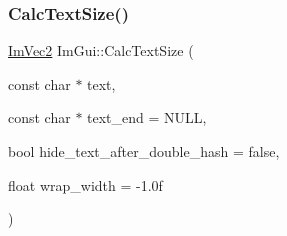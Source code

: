 \subsubsection{\texorpdfstring{Calc\+Text\+Size()}{CalcTextSize()}}
{\footnotesize\ttfamily \mbox{\hyperlink{struct_im_vec2}{Im\+Vec2}} Im\+Gui\+::\+Calc\+Text\+Size (\begin{DoxyParamCaption}\item[{const char $\ast$}]{text,  }\item[{const char $\ast$}]{text\+\_\+end = {\ttfamily NULL},  }\item[{bool}]{hide\+\_\+text\+\_\+after\+\_\+double\+\_\+hash = {\ttfamily false},  }\item[{float}]{wrap\+\_\+width = {\ttfamily -\/1.0f} }\end{DoxyParamCaption})}

